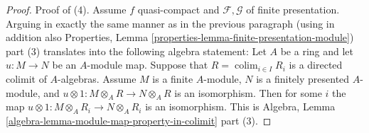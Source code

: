 \documentclass[10pt,a4paper]{amsart}
\theoremstyle{plain}
\theoremstyle{definition}
\theoremstyle{remark}
\numberwithin{equation}{subsection}
\def\colim{\mathop{\mathrm{colim}}\nolimits}
\begin{document}
\begin{proof}
\medskip\noindent
Proof of (4).
Assume $f$ quasi-compact and $\mathcal{F}, \mathcal{G}$ of finite presentation.
Arguing in exactly the same manner as in the previous paragraph
(using in addition also
Properties, Lemma \ref{properties-lemma-finite-presentation-module})
part (3) translates into the following algebra statement:
Let $A$ be a ring and let $u : M \to N$ be an $A$-module map.
Suppose that $R = \colim_{i \in I} R_i$ is a directed colimit
of $A$-algebras. Assume $M$ is a finite $A$-module, $N$ is a finitely
presented $A$-module, and
$u \otimes 1 : M \otimes_A R \to N \otimes_A R$ is an isomorphism.
Then for some $i$ the map
$u \otimes 1 : M \otimes_A R_i \to N \otimes_A R_i$ is an isomorphism.
This is
Algebra, Lemma \ref{algebra-lemma-module-map-property-in-colimit} part (3).
\end{proof}
\end{document}
